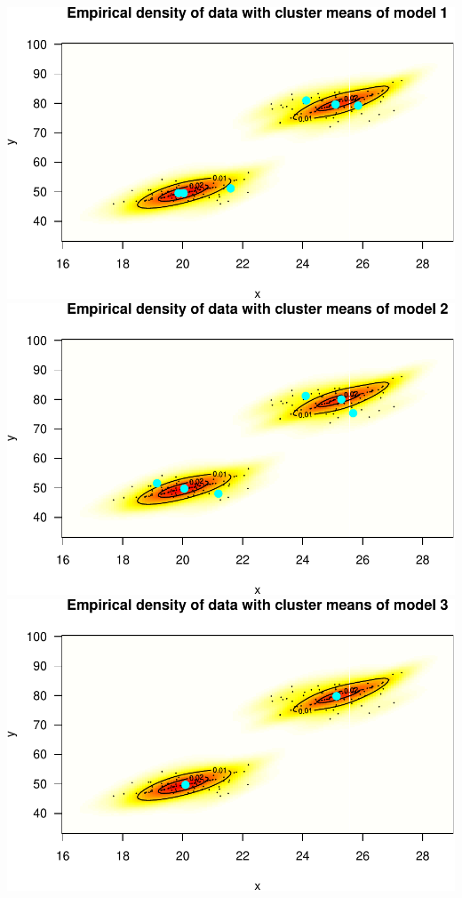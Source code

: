 \documentclass[]{article}
\begin{document}
\includegraphics{mclust_sim_files/figure-latex/unnamed-chunk-3-1.pdf}
\includegraphics{mclust_sim_files/figure-latex/unnamed-chunk-3-2.pdf}
\includegraphics{mclust_sim_files/figure-latex/unnamed-chunk-3-3.pdf}
\end{document}
